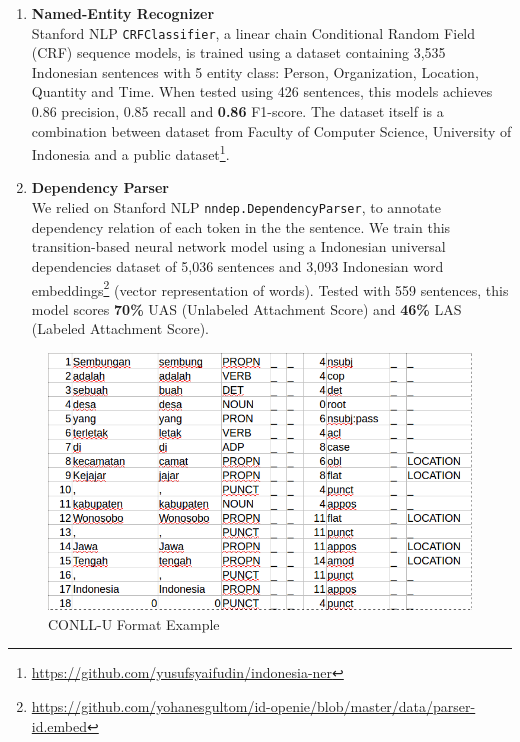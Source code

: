\documentclass[conference,compsoc]{IEEEtran}
\begin{document}
\begin{enumerate}
This lemmatizer yields \textbf{99\%} accuracy when tested using dataset of 5,638 token-lemma pairs\footnote{\url{https://github.com/davidchristiandy/lemmatizer}}. \\

\item \textbf{Named-Entity Recognizer} \\

Stanford NLP \verb|CRFClassifier|\cite{finkel2005incorporating}, a linear chain Conditional Random Field (CRF) sequence models, is trained using a dataset containing 3,535 Indonesian sentences with 5 entity class: Person, Organization, Location, Quantity and Time. When tested using 426 sentences, this models achieves 0.86 precision, 0.85 recall and \textbf{0.86} F1-score. The dataset itself is a combination between dataset from Faculty of Computer Science, University of Indonesia and a public dataset\footnote{\url{https://github.com/yusufsyaifudin/indonesia-ner}}. \\

\item \textbf{Dependency Parser} \\

We relied on Stanford NLP \verb|nndep.DependencyParser|\cite{chen2014fast}, to annotate dependency relation of each token in the the sentence. We train this transition-based neural network model using a Indonesian universal dependencies dataset of 5,036 sentences and 3,093 Indonesian word embeddings\footnote{\url{https://github.com/yohanesgultom/id-openie/blob/master/data/parser-id.embed}} (vector representation of words). Tested with 559 sentences, this model scores \textbf{70\%} UAS (Unlabeled Attachment Score) and \textbf{46\%} LAS (Labeled Attachment Score).


\end{enumerate}

\begin{figure}
\centering
\includegraphics[scale=0.35]{conllu_example}
\caption{CONLL-U Format Example}
\label{fig_conllu_example}
\end{figure}
\end{document}
